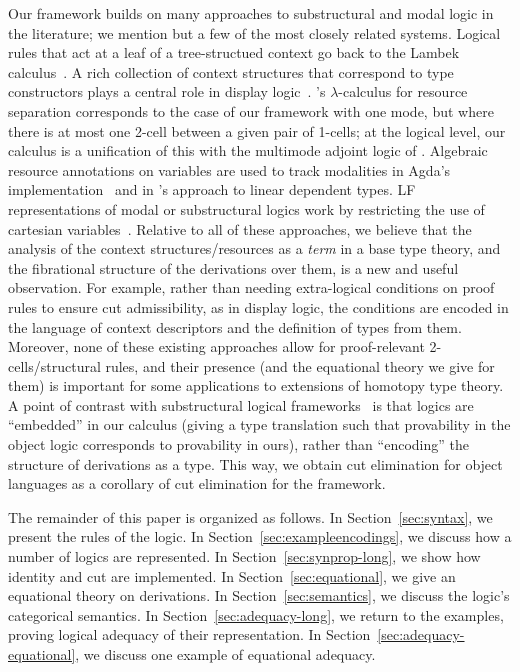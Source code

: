 Our framework builds on many approaches to substructural and modal logic
in the literature; we mention but a few of the most closely related
systems.  Logical rules that act at a leaf of a tree-structued context
go back to the Lambek calculus~\citep{lambek58calculus}.  A rich
collection of context structures that correspond to type constructors
plays a central role in display logic~\citep{belnap82display}.
\citet{atkey04separation}'s $\lambda$-calculus for resource separation
corresponds to the case of our framework with one mode, but where there
is at most one 2-cell between a given pair of 1-cells; at the logical
level, our calculus is a unification of this with the multimode adjoint
logic of \citet{reed09adjoint}.  Algebraic resource annotations on
variables are used to track modalities in Agda's
implementation~\citep{abel15modal} and in \citet{mcbride16nuttin}'s
approach to linear dependent types.  LF representations of modal or
substructural logics work by restricting the use of cartesian
variables~\citep{crary10substructural}.  Relative to all of these
approaches, we believe that the analysis of the context
structures/resources as a \emph{term} in a base type theory, and the
fibrational structure of the derivations over them, is a new and useful
observation.  For example, rather than needing extra-logical conditions
on proof rules to ensure cut admissibility, as in display logic, the
conditions are encoded in the language of context descriptors and the
definition of types from them.  Moreover, none of these existing
approaches allow for proof-relevant 2-cells/structural rules, and their
presence (and the equational theory we give for them) is important for
some applications to extensions of homotopy type theory.  A point of
contrast with substructural logical
frameworks~\citep{cervesatopfenning02llf,watkins+03clf-tr,reed09thesis}
is that logics are ``embedded'' in our calculus (giving a type
translation such that provability in the object logic corresponds to
provability in ours), rather than ``encoding'' the structure of
derivations as a type.  This way, we obtain cut elimination for object
languages as a corollary of cut elimination for the framework.

The remainder of this paper is organized as follows.  In
Section~\ref{sec:syntax}, we present the rules of the logic.  In
Section~\ref{sec:exampleencodings}, we discuss how a number of logics
are represented.  In Section~\ref{sec:synprop-long}, we show how
identity and cut are implemented.  In Section~\ref{sec:equational}, we
give an equational theory on derivations.  In
Section~\ref{sec:semantics}, we discuss the logic's categorical
semantics.  In Section~\ref{sec:adequacy-long}, we return to the
examples, proving logical adequacy of their representation.  In
Section~\ref{sec:adequacy-equational}, we discuss one example of
equational adequacy.
